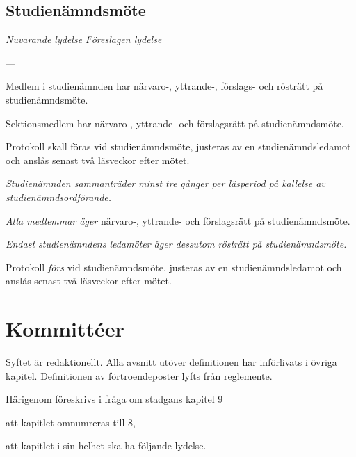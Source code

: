 \documentclass{article}
\newenvironment{lydelse}
    {\begin{paracol}{2}%
        \emph{Nuvarande lydelse}%
        \switchcolumn%
        \emph{Föreslagen lydelse}%
    \end{paracol}%
    \begin{enumerate}[label=\thesubsection.\arabic*]%
    \begin{paracol}{2}%
    }{\end{paracol}\end{enumerate}}
\begin{document}
\subsection{Studienämndsmöte}
\begin{lydelse}
  \setcounter{section}{8}
  \setcounter{subsection}{4}
  \item[] ---
  \item Medlem i studienämnden har närvaro-, yttrande-, förslags- och rösträtt på studienämndsmöte.
  \item Sektionsmedlem har närvaro-, yttrande- och förslagsrätt på studienämndsmöte.
  \setcounter{subsection}{3}
  \setcounter{enumi}{0}   
  \item Protokoll skall föras vid studienämndsmöte, justeras av en studienämndsledamot och anslås senast två läsveckor efter mötet.
  \switchcolumn
  \setcounter{section}{7}
  \setcounter{subsection}{1}
  \item \emph{Studienämnden sammanträder minst tre gånger per läsperiod på kallelse av studienämndsordförande.}
  \item \emph{Alla medlemmar äger} närvaro-, yttrande- och förslagsrätt på studienämndsmöte.
  \item \emph{Endast studienämndens ledamöter äger dessutom rösträtt på studienämndsmöte.}
  \item Protokoll \emph{förs} vid studienämndsmöte, justeras av en studienämndsledamot och anslås senast två läsveckor efter mötet.
\end{lydelse}
\setcounter{section}{7}
\setcounter{subsection}{2}

\section{Kommittéer}
Syftet är redaktionellt.
Alla avsnitt utöver definitionen har införlivats i övriga kapitel.
Definitionen av förtroendeposter lyfts från reglemente.

Härigenom föreskrivs i fråga om stadgans kapitel 9
\begin{dels}
\item att kapitlet omnumreras till 8,
\item att kapitlet i sin helhet ska ha följande lydelse.
\end{dels}
\end{document}

